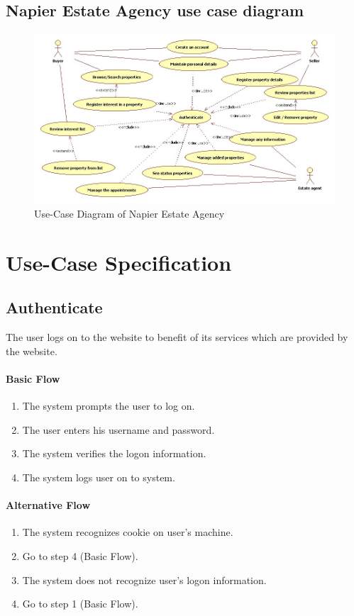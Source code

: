 \documentclass[a4paper,12pt]{article}
\begin{document}
\subsection{Napier Estate Agency use case diagram}
\begin{figure}[htbp]
\begin{center}
\includegraphics[width=\linewidth]{pics/useCases.jpg}
\end{center}
\caption{\footnotesize Use-Case Diagram of Napier Estate Agency}
\end{figure}


\section{Use-Case Specification}

\subsection{Authenticate}

The user logs on to the website to benefit of its services which are provided by the website.

\paragraph{Basic Flow}
\begin{enumerate}
\item The system prompts the user to log on.
\item The user enters his username and password.
\item The system verifies the logon information.
\item The system logs user on to system.
\end{enumerate}
\paragraph{Alternative Flow}
\begin{enumerate}
\item The system recognizes cookie on user's machine. 
\item Go to step 4 (Basic Flow).
\item The system does not recognize user's logon information.
\item Go to step 1 (Basic Flow).
\end{enumerate}
\end{document}
